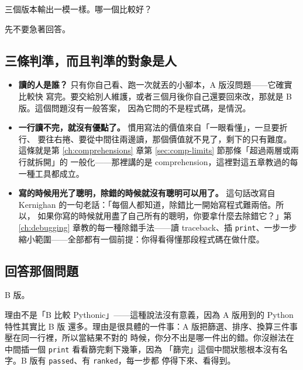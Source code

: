 
三個版本輸出一模一樣。哪一個比較好？

先不要急著回答。

\subsection*{三條判準，而且判準的對象是人}

\begin{itemize}
\item \textbf{讀的人是誰？} 只有你自己看、跑一次就丟的小腳本，A 版沒問題——它確實比較快
寫完。要交給別人維護，或者三個月後你自己還要回來改，那就是 B 版。這個問題沒有一般答案，
因為它問的不是程式碼，是情況。
\item \textbf{一行讀不完，就沒有優點了。} 慣用寫法的價值來自「一眼看懂」，一旦要折行、
要往右捲、要從中間往兩邊讀，那個價值就不見了，剩下的只有難度。這條就是第
\ref{ch:comprehensions} 章第 \ref{sec:comp-limits} 節那條「超過兩層或兩行就拆開」的
一般化——那裡講的是 comprehension，這裡對這五章教過的每一種工具都成立。
\item \textbf{寫的時候用光了聰明，除錯的時候就沒有聰明可以用了。} 這句話改寫自
Kernighan 的一句老話：「每個人都知道，除錯比一開始寫程式難兩倍。所以，
如果你寫的時候就用盡了自己所有的聰明，你要拿什麼去除錯它？」第 \ref{ch:debugging} 章教的每一種除錯手法——讀 traceback、插
\texttt{print}、一步一步縮小範圍——全部都有一個前提：你得看得懂那段程式碼在做什麼。
\end{itemize}


\subsection*{回答那個問題}

B 版。

理由不是「B 比較 Pythonic」——這種說法沒有意義，因為 A 版用到的 Python 特性其實比 B 版
還多。理由是很具體的一件事：A 版把篩選、排序、換算三件事壓在同一行裡，所以當結果不對的
時候，你分不出是哪一件出的錯。你沒辦法在中間插一個 \texttt{print} 看看篩完剩下幾筆，因為
「篩完」這個中間狀態根本沒有名字。B 版有 \texttt{passed}、有 \texttt{ranked}，每一步都
停得下來、看得到。

